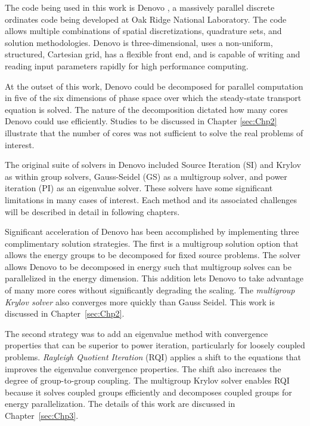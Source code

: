 The code being used in this work is Denovo \cite{Evans2009}, a massively parallel discrete ordinates code being developed at Oak Ridge National Laboratory. The code allows multiple combinations of spatial discretizations, quadrature sets, and solution methodologies. Denovo is three-dimensional, uses a non-uniform, structured, Cartesian grid, has a flexible front end, and is capable of writing and reading input parameters rapidly for high performance computing. 

At the outset of this work, Denovo could be decomposed for parallel computation in five of the six dimensions of phase space over which the steady-state transport equation is solved. The nature of the decomposition dictated how many cores Denovo could use efficiently. Studies to be discussed in Chapter \ref{sec:Chp2} illustrate that the number of cores was not sufficient to solve the real problems of interest. 

The original suite of solvers in Denovo included Source Iteration (SI) and Krylov as within group solvers, Gauss-Seidel (GS) as a multigroup solver, and power iteration (PI) as an eigenvalue solver. These solvers have some significant limitations in many cases of interest. Each method and its associated challenges will be described in detail in following chapters. 

Significant acceleration of Denovo has been accomplished by implementing three complimentary solution strategies. The first is a multigroup solution option that allows the energy groups to be decomposed for fixed source problems. The solver allows Denovo to be decomposed in energy such that multigroup solves can be parallelized in the energy dimension. This addition lets Denovo to take advantage of many more cores without significantly degrading the scaling. The \emph{multigroup Krylov solver} also converges more quickly than Gauss Seidel. This work is discussed in Chapter~\ref{sec:Chp2}.

The second strategy was to add an eigenvalue method with convergence properties that can be superior to power iteration, particularly for loosely coupled problems. \emph{Rayleigh Quotient Iteration} (RQI) applies a shift to the equations that improves the eigenvalue convergence properties. The shift also increases the degree of group-to-group coupling. The multigroup Krylov solver enables RQI because it solves coupled groups efficiently and decomposes coupled groups for energy parallelization. The details of this work are discussed in Chapter~\ref{sec:Chp3}.

